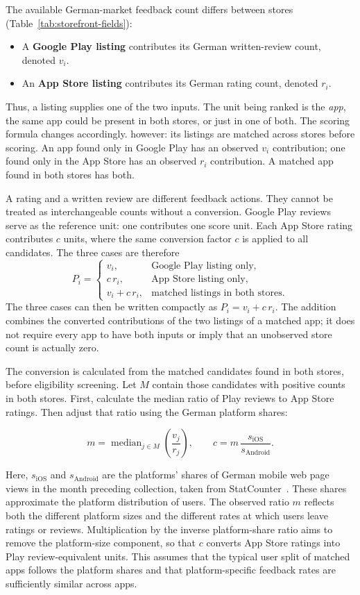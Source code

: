 \documentclass[twoside,its]{bossthesis}
\begin{document}
The available German-market feedback count differs between stores
(Table~\ref{tab:storefront-fields}):
\begin{itemize}
  \item A \textbf{Google Play listing} contributes its German written-review
    count, denoted $v_i$.
  \item An \textbf{App Store listing} contributes its German rating count,
    denoted $r_i$.
\end{itemize}
Thus, a listing supplies one of the two inputs. The unit being ranked is the
\emph{app}, the same app could be present in both stores, or just in one of both. The scoring formula changes accordingly.
 however: its listings are matched across stores before scoring.
An app found only in Google Play has an observed $v_i$ contribution; one found
only in the App Store has an observed $r_i$ contribution. A matched app found
in both stores has both.

A rating and a written review are different feedback actions. They cannot be
treated as interchangeable counts without a conversion. Google Play reviews
serve as the reference unit: one contributes one score unit. Each App Store
rating contributes $c$ units, where the same conversion factor $c$ is applied
to all candidates. The three cases are therefore
\[
  P_i =
  \begin{cases}
    v_i, & \text{Google Play listing only},\\
    c\,r_i, & \text{App Store listing only},\\
    v_i+c\,r_i, & \text{matched listings in both stores}.
  \end{cases}
\]
The three cases can then be written compactly as
$P_i=v_i+c\,r_i$. The addition combines the converted contributions of the two
listings of a matched app; it does not require every app to have both inputs
or imply that an unobserved store count is actually zero.

The conversion is calculated from the matched candidates found in both stores,
before eligibility screening. Let $M$ contain those candidates with positive
counts in both stores. First, calculate the median ratio of Play reviews to
App Store ratings. Then adjust that ratio using the German platform shares:

\[
  m = \operatorname{median}_{j\in M}\!\left(\frac{v_j}{r_j}\right),
  \qquad
  c = m\,\frac{s_{\mathrm{iOS}}}{s_{\mathrm{Android}}}.
\]

Here, $s_{\mathrm{iOS}}$ and $s_{\mathrm{Android}}$ are the platforms' shares of
German mobile web page views in the month preceding collection, taken from
StatCounter~\parencite{statcounter2026os}. These shares approximate the
platform distribution of users. The observed ratio $m$ reflects both the
different platform sizes and the different rates at which users leave ratings
or reviews. Multiplication by the inverse platform-share ratio aims to remove
the platform-size component, so that $c$ converts App Store ratings into Play
review-equivalent units. This assumes that the typical user split of matched
apps follows the platform shares and that platform-specific feedback rates
are sufficiently similar across apps. 
\end{document}
